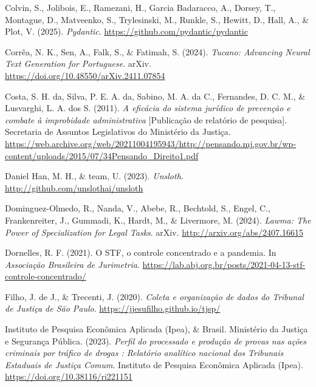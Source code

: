 \documentclass[
  12pt,
]{article}
\newlength{\cslhangindent}
\newenvironment{CSLReferences}[2] %
 {\begin{list}{}{%
  \setlength{\itemindent}{0pt}
  \setlength{\leftmargin}{0pt}
  \setlength{\parsep}{0pt}
  \ifodd #1
   \setlength{\leftmargin}{\cslhangindent}
   \setlength{\itemindent}{-1\cslhangindent}
  \fi
  \setlength{\itemsep}{#2\baselineskip}}}
 {\end{list}}
\begin{document}
\begin{CSLReferences}{1}{0}
Colvin, S., Jolibois, E., Ramezani, H., Garcia Badaracco, A., Dorsey,
T., Montague, D., Matveenko, S., Trylesinski, M., Runkle, S., Hewitt,
D., Hall, A., \& Plot, V. (2025). \emph{Pydantic}.
\url{https://github.com/pydantic/pydantic}

Corrêa, N. K., Sen, A., Falk, S., \& Fatimah, S. (2024). \emph{Tucano:
{Advancing} {Neural} {Text} {Generation} for {Portuguese}}. arXiv.
\url{https://doi.org/10.48550/arXiv.2411.07854}

Costa, S. H. da, Silva, P. E. A. da, Sabino, M. A. da C., Fernandes, D.
C. M., \& Lusvarghi, L. A. dos S. (2011). \emph{A eficácia do sistema
jurídico de prevenção e combate à improbidade administrativa}
{[}Publicação de relatório de pesquisa{]}. Secretaria de Assuntos
Legislativos do Ministério da Justiça.
\url{https://web.archive.org/web/20211004195943/http://pensando.mj.gov.br/wp-content/uploads/2015/07/34Pensando_Direito1.pdf}

Daniel Han, M. H., \& team, U. (2023). \emph{Unsloth}.
\url{http://github.com/unslothai/unsloth}

Dominguez-Olmedo, R., Nanda, V., Abebe, R., Bechtold, S., Engel, C.,
Frankenreiter, J., Gummadi, K., Hardt, M., \& Livermore, M. (2024).
\emph{Lawma: {The} {Power} of {Specialization} for {Legal} {Tasks}}.
arXiv. \url{http://arxiv.org/abs/2407.16615}

Dornelles, R. F. (2021). O {STF}, o controle concentrado e a pandemia.
In \emph{Associação Brasileira de Jurimetria}.
\url{https://lab.abj.org.br/posts/2021-04-13-stf-controle-concentrado/}

Filho, J. de J., \& Trecenti, J. (2020). \emph{Coleta e organização de
dados do {Tribunal} de {Justiça} de {São} {Paulo}}.
\url{https://jjesufilho.github.io/tjsp/}

Instituto de Pesquisa Econômica Aplicada (Ipea), \& Brasil. Ministério
da Justiça e Segurança Pública. (2023). \emph{Perfil do processado e
produção de provas nas ações criminais por tráfico de drogas : Relatório
analítico nacional dos {Tribunais} {Estaduais} de {Justiça} {Comum}}.
Instituto de Pesquisa Econômica Aplicada (Ipea).
\url{https://doi.org/10.38116/ri221151}


\end{CSLReferences}
\end{document}
